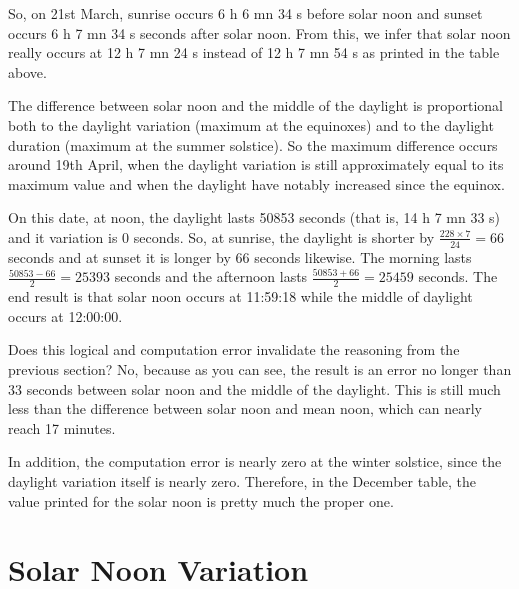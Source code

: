 \documentclass[a4paper]{article}
\newenvironment{texte}{\rmfamily}{}
\newcommand{\daynoonhhmmss}[0]{12:00:00}
\newcommand{\deltalight}[0]{0}
\begin{document}
\begin{texte}
So, on 21st March, sunrise occurs 6 h 6 mn 34 s
before solar noon and sunset occurs 
6 h 7 mn 34 s seconds after solar noon.
From this, we infer that solar noon really occurs
at 12 h 7 mn 24 s instead of 12 h 7 mn 54 s
as printed in the table above.

The difference between solar noon and the
middle of the daylight is proportional both to the
daylight variation (maximum at the equinoxes)
and to the daylight duration (maximum at the summer
solstice). So the maximum difference occurs
around 19th April, when the daylight variation
is still approximately equal to its maximum value
and when the daylight have notably increased since
the equinox.

\vspace{2mm}
\vspace{2mm}

On this date, at noon, the daylight lasts 50853 seconds
(that is, 14 h 7 mn 33 s) and it variation is \deltalight{} seconds.
So, at sunrise, the daylight is shorter by
\( \frac{228 \times 7}{24} = 66\) seconds and at sunset it is longer
by 66 seconds likewise. The morning lasts
\( \frac{50853 - 66}{2} = 25393 \) seconds and the afternoon lasts \( \frac{50853 + 66}{2} = 25459 \) seconds.
The end result is that solar noon occurs at 11:59:18
while the middle of daylight occurs at \daynoonhhmmss{}.

Does this logical and computation error invalidate
the reasoning from the previous section? No, because
as you can see, the result is an error no longer
than 33 seconds between solar noon and the
middle of the daylight. This is still much less
than the difference between solar noon and mean noon,
which can nearly reach 17 minutes.


In addition, the computation error is nearly zero
at the winter solstice, since the daylight variation
itself is nearly zero. Therefore, in the December table, 
the value printed for the solar noon is pretty much
the proper one.

\section{Solar Noon Variation}



\end{texte}
\end{document}
